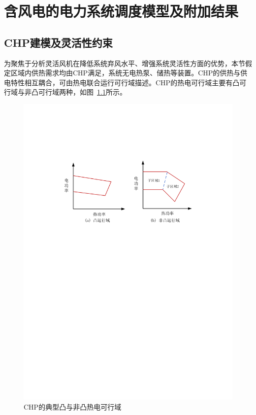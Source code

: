 \chapter{含风电的电力系统调度模型及附加结果}
\label{cha:cons-flexibility-CHP-Thermal}

\section{CHP建模及灵活性约束}
为聚焦于分析灵活风机在降低系统弃风水平、增强系统灵活性方面的优势，本节假定区域内供热需求均由CHP满足，系统无电热泵、储热等装置。CHP的供热与供电特性相互耦合，可由热电联合运行可行域描述。CHP的热电可行域主要有凸可行域与非凸可行域两种，如图~\ref{fig:Append-CHP-Convexity}所示。

\begin{figure}[H] %
  \centering
  \includegraphics[scale=0.75]{figures/Chap-Append-CHP-Convexity.pdf}
  \caption{CHP的典型凸与非凸热电可行域}
  \label{fig:Append-CHP-Convexity}
\end{figure}

